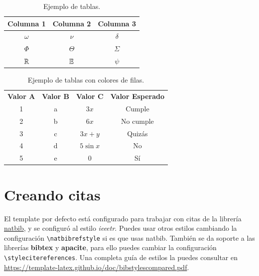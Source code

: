 \begin{table}[H] %
	\centering
	\caption{Ejemplo de tablas.}
	\begin{tabular}{ccc}
		\hline
		\textbf{Columna 1} & \textbf{Columna 2} & \textbf{Columna 3} \bigstrut\\
		\hline
		$\omega$ & $\nu$ & $\delta$ \bigstrut[t]\\
		$\Phi$ & $\Theta$ & $\varSigma$ \\
		$\mathbb{R}$ & $\mathbb{E}$ & $\psi$ \\
		\hline
	\end{tabular}
	\label{tab:tabla-1}
\end{table}

\enabletablerowcolor
\begin{table}[H]
	\centering
	\caption{Ejemplo de tablas con colores de filas.}
	\begin{tabular}{ccccc}
		\rowcolor[rgb]{ .749,  .749,  .749} \textbf{Valor A} & \textbf{Valor B} & \textbf{Valor C} & \multicolumn{2}{c}{\textbf{Valor Esperado}} \\
		1     & a     & $3x$  & \multicolumn{2}{c}{Cumple} \\
		2     & b     & $6x$  & \multicolumn{2}{c}{No cumple} \\
		3     & c     & $3x+y$ & \multicolumn{2}{c}{Quizás} \\
		4     & d     & $5\sin x$ & \multicolumn{2}{c}{No} \\
		5     & e     & $0$ & \multicolumn{2}{c}{Sí} \\
	\end{tabular}
\end{table}
\disabletablerowcolor
	
\section{Creando citas}

El template por defecto está configurado para trabajar con citas de la librería \href{https://www.ctan.org/pkg/natbib}{natbib}, y se configuró al estilo \textit{ieeetr}. Puedes usar otros estilos cambiando la configuración \texttt{\textbackslash natbibrefstyle} si es que usas natbib. También se da soporte a las librerías \textbf{bibtex} y \textbf{apacite}, para ello puedes cambiar la configuración \texttt{\textbackslash stylecitereferences}. Una completa guía de estilos la puedes consultar en \url{https://template-latex.github.io/doc/bibstylescompared.pdf}. \\

